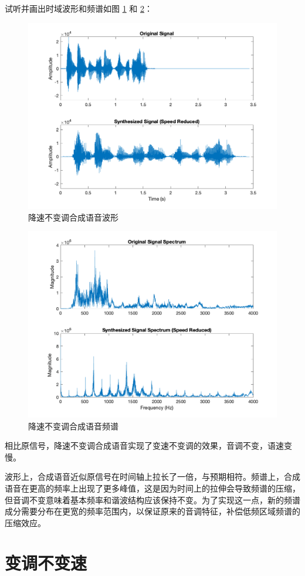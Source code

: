 \documentclass[a4paper]{article}  %
\begin{document}
试听并画出时域波形和频谱如图 \ref{fig:1_11_speed_reduced_signal_t} 和 \ref{fig:1_11_speed_reduced_signal_f}：

\begin{figure}[ht]
    \centering
    \includegraphics[width=.6\textwidth]{asserts/1_11_speed_reduced_signal_t.png}
    \caption{
        降速不变调合成语音波形
    }\label{fig:1_11_speed_reduced_signal_t}
\end{figure}

\begin{figure}[ht]
    \centering
    \includegraphics[width=.6\textwidth]{asserts/1_11_speed_reduced_signal_f.png}
    \caption{
        降速不变调合成语音频谱
    }\label{fig:1_11_speed_reduced_signal_f}
\end{figure}

相比原信号，降速不变调合成语音实现了变速不变调的效果，音调不变，语速变慢。

波形上，合成语音近似原信号在时间轴上拉长了一倍，与预期相符。频谱上，合成语音在更高的频率上出现了更多峰值，这是因为时间上的拉伸会导致频谱的压缩，但音调不变意味着基本频率和谐波结构应该保持不变。为了实现这一点，新的频谱成分需要分布在更宽的频率范围内，以保证原来的音调特征，补偿低频区域频谱的压缩效应。

\section{变调不变速}
\end{document}

